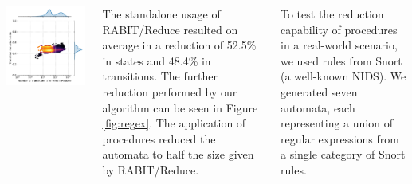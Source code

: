 \documentclass[25pt, a1paper, portrait]{tikzposter}
\begin{document}
\begin{columns}
{\begin{tikzfigure}
\begin{minipage}{0.21\textwidth}
                \includegraphics[width=1\linewidth]{images/intersect-all-trans.pdf}
            \end{minipage}
            \label{fig:regex}
        \end{tikzfigure}

        The standalone usage of RABIT/Reduce resulted on average in a reduction of 52.5\% in states and 48.4\% in transitions. The further reduction performed by our algorithm can be seen in Figure \ref{fig:regex}. The application of procedures reduced the automata to half the size given by RABIT/Reduce.
    }

     {

        To test the reduction capability of procedures in a real-world scenario, we used rules from Snort (a well-known NIDS). We generated seven automata, each representing a union of regular expressions from a single category of Snort rules.

}
\end{columns}
\end{document}
